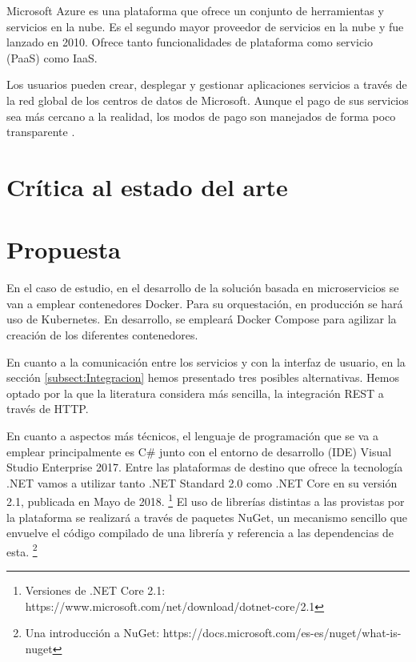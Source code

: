 \documentclass[11pt,spanish,listoffigures]{tfgetsinf}
\begin{document}
Microsoft Azure es una plataforma que ofrece un conjunto de herramientas y servicios en la nube. Es el segundo mayor proveedor de servicios en la nube y fue lanzado en 2010. Ofrece tanto funcionalidades de plataforma como servicio (PaaS) como IaaS.

Los usuarios pueden crear, desplegar y gestionar aplicaciones  servicios a través de la red global de los centros de datos de Microsoft. Aunque el pago de sus servicios sea más cercano a la realidad, los modos de pago son manejados de forma poco transparente \cite{Qaisi2016}.

\section{Crítica al estado del arte}

\section{Propuesta} \label{sect:Propuesta}

En el caso de estudio, en el desarrollo de la solución basada en microservicios se van a emplear contenedores Docker. Para su orquestación, en producción se hará uso de Kubernetes. En desarrollo, se empleará Docker Compose para agilizar la creación de los diferentes contenedores. 

En cuanto a la comunicación entre los servicios y con la interfaz de usuario, en la sección \ref{subsect:Integracion}  hemos presentado tres posibles alternativas. Hemos optado por la que la literatura considera más sencilla, la integración REST a través de HTTP.

En cuanto a aspectos más técnicos, el lenguaje de programación que se va a emplear principalmente es C\# junto con el entorno de desarrollo (IDE) Visual Studio Enterprise 2017. Entre las plataformas de destino que ofrece la tecnología .NET vamos a utilizar tanto .NET Standard 2.0 como .NET Core en su versión 2.1, publicada en Mayo de 2018. \footnote{ Versiones de .NET Core 2.1: https://www.microsoft.com/net/download/dotnet-core/2.1} El uso de librerías distintas a las provistas por la plataforma se realizará a través de paquetes NuGet, un mecanismo sencillo que envuelve el código compilado de una librería y referencia a las dependencias de esta. \footnote{ Una introducción a NuGet: https://docs.microsoft.com/es-es/nuget/what-is-nuget}
\end{document}
